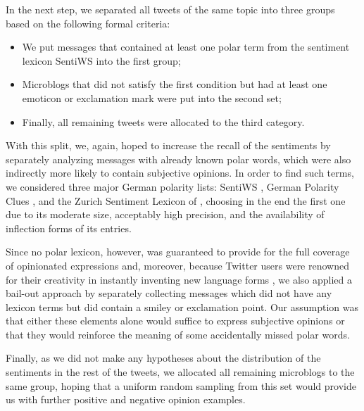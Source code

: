 In the next step, we separated all tweets of the same topic into three
groups based on the following formal criteria:
\begin{itemize}
\item We put messages that contained at least one polar term from the
  sentiment lexicon SentiWS \cite{Remus:10} into the first group;
\item Microblogs that did not satisfy the first condition but had at
  least one emoticon or exclamation mark were put into the second set;
\item Finally, all remaining tweets were allocated to the third
  category.
\end{itemize}
With this split, we, again, hoped to increase the recall of the
sentiments by separately analyzing messages with already known polar
words, which were also indirectly more likely to contain subjective
opinions.  In order to find such terms, we considered three major
German polarity lists: SentiWS \cite{Remus:10}, German Polarity Clues
\cite{Waltinger:10}, and the Zurich Sentiment Lexicon of
\citet{Clematide:10}, choosing in the end the first one due to its
moderate size, acceptably high precision, and the availability of
inflection forms of its entries.

Since no polar lexicon, however, was guaranteed to provide for the
full coverage of opinionated expressions and, moreover, because
Twitter users were renowned for their creativity in instantly
inventing new language forms \cite[see][]{Eisenstein:13}, we also
applied a bail-out approach by separately collecting messages which
did not have any lexicon terms but did contain a smiley or exclamation
point.  Our assumption was that either these elements alone would
suffice to express subjective opinions or that they would reinforce
the meaning of some accidentally missed polar words.

Finally, as we did not make any hypotheses about the distribution of
the sentiments in the rest of the tweets, we allocated all remaining
microblogs to the same group, hoping that a uniform random sampling
from this set would provide us with further positive and negative
opinion examples.

